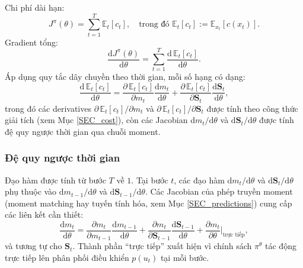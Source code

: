 Chi phí dài hạn:
\begin{equation}
    J^\pi(\theta) = \sum_{t=1}^{T} \mathbb{E}_t[c_t], \quad \text{trong đó } \mathbb{E}_t[c_t] := \mathbb{E}_{x_t}[c(x_t)].
    \label{chi_phi_tong}
\end{equation}
Gradient tổng:
\begin{equation}
    \frac{\mathrm{d}J^\pi(\theta)}{\mathrm{d}\theta} = \sum_{t=1}^{T} \frac{\mathrm{d}\,\mathbb{E}_t[c_t]}{\mathrm{d}\theta}.
    \label{gradient_tong}
\end{equation}
Áp dụng quy tắc dây chuyền theo thời gian, mỗi số hạng có dạng:
\begin{equation}
    \frac{\mathrm{d}\,\mathbb{E}_t[c_t]}{\mathrm{d}\theta} = \frac{\partial\,\mathbb{E}_t[c_t]}{\partial m_t}\frac{\mathrm{d}m_t}{\mathrm{d}\theta} + \frac{\partial\,\mathbb{E}_t[c_t]}{\partial \mathbf{S}_t}\frac{\mathrm{d}\mathbf{S}_t}{\mathrm{d}\theta},
    \label{gradient_tung_buoc}
\end{equation}
trong đó các derivatives $\partial\,\mathbb{E}_t[c_t]/\partial m_t$ và $\partial\,\mathbb{E}_t[c_t]/\partial \mathbf{S}_t$ được tính theo công thức giải tích (xem Mục \ref{SEC_cost}), còn các Jacobian $\mathrm{d}m_t/\mathrm{d}\theta$ và $\mathrm{d}\mathbf{S}_t/\mathrm{d}\theta$ được tính đệ quy ngược thời gian qua chuỗi moment.

\subsubsection{Đệ quy ngược thời gian}
\label{SUB_SUB_SEC_backward_recursion}

Đạo hàm được tính từ bước $T$ về $1$. Tại bước $t$, các đạo hàm $\mathrm{d}m_t/\mathrm{d}\theta$ và $\mathrm{d}\mathbf{S}_t/\mathrm{d}\theta$ phụ thuộc vào $\mathrm{d}m_{t-1}/\mathrm{d}\theta$ và $\mathrm{d}\mathbf{S}_{t-1}/\mathrm{d}\theta$. Các Jacobian của phép truyền moment (moment matching hay tuyến tính hóa, xem Mục \ref{SEC_predictions}) cung cấp các liên kết cần thiết:
\begin{equation}
    \frac{\mathrm{d}m_t}{\mathrm{d}\theta} = \frac{\partial m_t}{\partial m_{t-1}}\frac{\mathrm{d}m_{t-1}}{\mathrm{d}\theta} + \frac{\partial m_t}{\partial \mathbf{S}_{t-1}}\frac{\mathrm{d}\mathbf{S}_{t-1}}{\mathrm{d}\theta} + \frac{\partial m_t}{\partial \theta}\Biggr|_{\text{trực tiếp}},
    \label{grad_recursion}
\end{equation}
và tương tự cho $\mathbf{S}_t$. Thành phần ``trực tiếp'' xuất hiện vì chính sách $\pi^\theta$ tác động trực tiếp lên phân phối điều khiển $p(u_t)$ tại mỗi bước.

